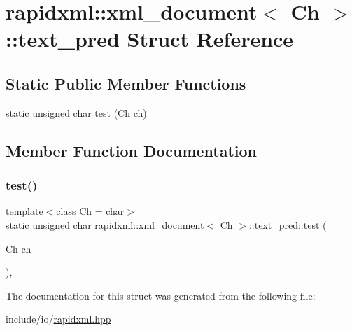 \hypertarget{structrapidxml_1_1xml__document_1_1text__pred}{}\section{rapidxml\+::xml\+\_\+document$<$ Ch $>$\+::text\+\_\+pred Struct Reference}
\label{structrapidxml_1_1xml__document_1_1text__pred}
\subsection*{Static Public Member Functions}
\begin{DoxyCompactItemize}
\item 
static unsigned char \mbox{\hyperlink{structrapidxml_1_1xml__document_1_1text__pred_a9822ef3cd730dc35179aef52026287ca}{test}} (Ch ch)
\end{DoxyCompactItemize}


\subsection{Member Function Documentation}
\mbox{\label{structrapidxml_1_1xml__document_1_1text__pred_a9822ef3cd730dc35179aef52026287ca}} 
\subsubsection{\texorpdfstring{test()}{test()}}
{\footnotesize\ttfamily template$<$class Ch = char$>$ \\
static unsigned char \mbox{\hyperlink{classrapidxml_1_1xml__document}{rapidxml\+::xml\+\_\+document}}$<$ Ch $>$\+::text\+\_\+pred\+::test (\begin{DoxyParamCaption}\item[{Ch}]{ch }\end{DoxyParamCaption})\hspace{0.3cm}{\ttfamily [inline]}, {\ttfamily [static]}}



The documentation for this struct was generated from the following file\+:\begin{DoxyCompactItemize}
\item 
include/io/\mbox{\hyperlink{rapidxml_8hpp}{rapidxml.\+hpp}}\end{DoxyCompactItemize}
